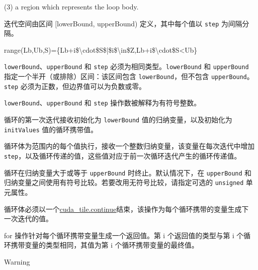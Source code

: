 \documentclass{article}
\begin{document}
(3) a region which represents the loop body.


迭代空间由区间 [lowerBound, upperBound) 定义，其中每个值以 \texttt{step} 为间隔分隔。


range(Lb,Ub,S)=\{Lb+i\$\textbackslash{}cdot\$S\$|\$i\$\textbackslash{}in\$Z,Lb+i\$\textbackslash{}cdot\$S<Ub\}

\texttt{lowerBound}、\texttt{upperBound} 和 \texttt{step} 必须为相同类型。\texttt{lowerBound} 和 \texttt{upperBound} 指定一个半开（或排除）区间：该区间包含 \texttt{lowerBound}，但不包含 \texttt{upperBound}。\texttt{step} 必须为正数，但边界值可以为负数或零。


\texttt{lowerBound}、\texttt{upperBound} 和 \texttt{step} 操作数被解释为有符号整数。


循环的第一次迭代接收初始化为 \texttt{lowerBound} 值的归纳变量，以及初始化为 \texttt{initValues} 值的循环携带值。


循环体为范围内的每个值执行，接收一个整数归纳变量，该变量在每次迭代中增加 \texttt{step}，以及循环传递的值，这些值对应于前一次循环迭代产生的循环传递值。


循环在归纳变量大于或等于 \texttt{upperBound} 时终止。默认情况下，在 \texttt{upperBound} 和归纳变量之间使用有符号比较。若要改用无符号比较，请指定可选的 \texttt{unsigned} 单元属性。


循环体必须以一个\href{https://docs.nvidia.com/cuda/tile-ir/latest/sections/operations.html#op-cuda-tile-continue}{cuda\_tile.continue}结束，该操作为每个循环携带的变量生成下一次迭代的值。


for 操作针对每个循环携带变量生成一个返回值。第 i 个返回值的类型与第 i 个循环携带变量的类型相同，其值为第 i 个循环携带变量的最终值。


Warning
\end{document}
